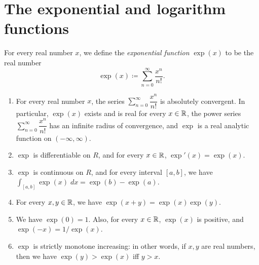 \section{The exponential and logarithm functions}\label{sec:4.5}

\begin{defn}\label{4.5.1}
  For every real number \(x\), we define the \emph{exponential function} \(\exp(x)\) to be the real number
  \[
    \exp(x) \coloneqq \sum_{n = 0}^\infty \dfrac{x^n}{n!}.
  \]
\end{defn}

\begin{thm}\label{4.5.2}
  \quad
  \begin{enumerate}
    \item For every real number \(x\), the series \(\sum_{n = 0}^\infty \dfrac{x^n}{n!}\) is absolutely convergent.
          In particular, \(\exp(x)\) exists and is real for every \(x \in \mathbb{R}\), the power series \(\sum_{n = 0}^\infty \dfrac{x^n}{n!}\) has an infinite radius of convergence, and \(\exp\) is a real analytic function on \((-\infty, \infty)\).
    \item \(\exp\) is differentiable on \(R\), and for every \(x \in \mathbb{R}\), \(\exp'(x) = \exp(x)\).
    \item \(\exp\) is continuous on \(R\), and for every interval \([a, b]\), we have \(\int_{[a, b]} \exp(x) \; dx = \exp(b) - \exp(a)\).
    \item For every \(x, y \in \mathbb{R}\), we have \(\exp(x + y) = \exp(x) \exp(y)\).
    \item We have \(\exp(0) = 1\).
          Also, for every \(x \in \mathbb{R}\), \(\exp(x)\) is positive, and \(\exp(-x) = 1 / \exp(x)\).
    \item \(\exp\) is strictly monotone increasing:
          in other words, if \(x, y\) are real numbers, then we have \(\exp(y) > \exp(x)\) iff \(y > x\).
  \end{enumerate}
\end{thm}

